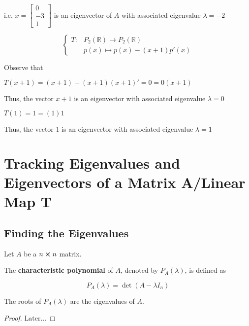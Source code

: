 \begin{example}
	i.e. $x = \begin{bmatrix}
		0\\-3\\1
	\end{bmatrix}$ is an eigenvector of $A$ with associated eigenvalue $\lambda = -2$
\end{example}

\begin{example}
	\[\begin{cases}
		T:&P_2(\mathbb{R}) \to P_2(\mathbb{R})\\
		&p(x) \mapsto p(x) - (x+1)p'(x)
	\end{cases}\]
	
	Observe that

	$T(x+1) = (x+1) - (x+1)(x+1)' = 0 = 0 (x+1)$

	Thus, the vector $x+1$ is an eigenvector with associated eigenvalue $\lambda = 0$

	$T(1) = 1 = (1) 1$

	Thus, the vector 1 is an eigenvector with associated eigenvalue $\lambda = 1$
\end{example}

\section{Tracking Eigenvalues and Eigenvectors of a Matrix A/Linear Map T}

\subsection{Finding the Eigenvalues}

\begin{definition}
	Let $A$ be a $n \cross n$ matrix.

	The \textbf{characteristic polynomial} of $A$, denoted by $P_A(\lambda)$, is defined as

	\begin{equation} \label{eq:char-poly}
		P_A(\lambda) = \det(A - \lambda I_n)
	\end{equation}
\end{definition}

\begin{theorem}
	The roots of $P_A(\lambda)$ are the eigenvalues of $A$.

	\begin{proof}
		Later...
	\end{proof}
\end{theorem}

